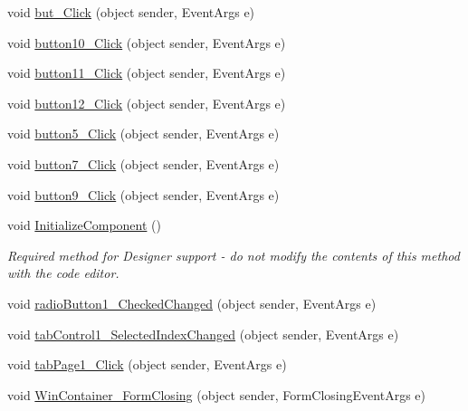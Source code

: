 \begin{DoxyCompactItemize}
\item 
void \hyperlink{class__7___doroshenko__forms2__is52_1_1_win_container_a217dc01fee62dcfef24c4345900b86c7}{but\+\_\+\+Click} (object sender, Event\+Args e)
\item 
void \hyperlink{class__7___doroshenko__forms2__is52_1_1_win_container_a6afaa8f33f51c512b4ef25f24f2cba7a}{button10\+\_\+\+Click} (object sender, Event\+Args e)
\item 
void \hyperlink{class__7___doroshenko__forms2__is52_1_1_win_container_add06f6a4a96485f5434f2f47b92f1f90}{button11\+\_\+\+Click} (object sender, Event\+Args e)
\item 
void \hyperlink{class__7___doroshenko__forms2__is52_1_1_win_container_ac4f8e9e2c73d7f6532d6b0d79d7c2547}{button12\+\_\+\+Click} (object sender, Event\+Args e)
\item 
void \hyperlink{class__7___doroshenko__forms2__is52_1_1_win_container_a25a617a2c938199596c5dc653fba1770}{button5\+\_\+\+Click} (object sender, Event\+Args e)
\item 
void \hyperlink{class__7___doroshenko__forms2__is52_1_1_win_container_ab6d9121748802b45866dd3365e50015c}{button7\+\_\+\+Click} (object sender, Event\+Args e)
\item 
void \hyperlink{class__7___doroshenko__forms2__is52_1_1_win_container_af5d7e2bcc6b12621d1bcc172c269cea7}{button9\+\_\+\+Click} (object sender, Event\+Args e)
\item 
void \hyperlink{class__7___doroshenko__forms2__is52_1_1_win_container_a2273d289ead85c38898634df2eca5613}{Initialize\+Component} ()
\begin{DoxyCompactList}\small\item\em Required method for Designer support -\/ do not modify the contents of this method with the code editor. \end{DoxyCompactList}\item 
void \hyperlink{class__7___doroshenko__forms2__is52_1_1_win_container_ada938faa4917765e73fc3ea2e3aaab12}{radio\+Button1\+\_\+\+Checked\+Changed} (object sender, Event\+Args e)
\item 
void \hyperlink{class__7___doroshenko__forms2__is52_1_1_win_container_aaef3f84ba6d8958538fcf77a55edb5cd}{tab\+Control1\+\_\+\+Selected\+Index\+Changed} (object sender, Event\+Args e)
\item 
void \hyperlink{class__7___doroshenko__forms2__is52_1_1_win_container_af661b89123cbc53d5c01329051b1a388}{tab\+Page1\+\_\+\+Click} (object sender, Event\+Args e)
\item 
void \hyperlink{class__7___doroshenko__forms2__is52_1_1_win_container_af271aa1fe9946ebf1459cc9b90d07307}{Win\+Container\+\_\+\+Form\+Closing} (object sender, Form\+Closing\+Event\+Args e)
\end{DoxyCompactItemize}

